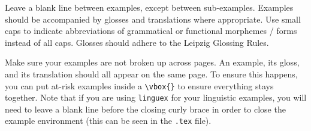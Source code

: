 \documentclass[xelatex,linguex]{TWPL}
\begin{document}









Leave a blank line between examples, except between sub-examples. Examples should be accompanied by glosses and translations where appropriate. Use small caps to indicate abbreviations of grammatical or functional morphemes / forms instead of all caps. Glosses should adhere to the Leipzig Glossing Rules.

Make sure your examples are not broken up across pages. An example, its gloss, and its translation should all appear on the same page. To ensure this happens, you can put at-risk examples inside a \verb;\vbox{}; to ensure everything stays together. Note that if you are using \texttt{linguex} for your linguistic examples, you will need to leave a blank line before the closing curly brace in order to close the example environment (this can be seen in the \texttt{.tex} file).
\end{document}
